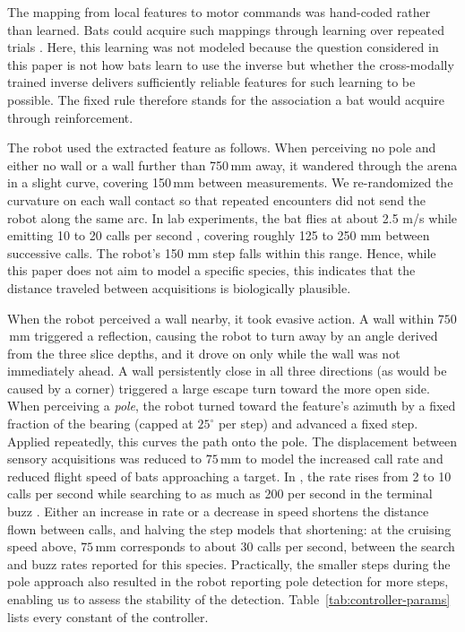 \documentclass[11pt]{article}
\begin{document}
The mapping from local features to motor commands was hand-coded rather than learned. Bats could acquire such mappings through learning over repeated trials \citep[e.g.,][]{Ghose2003,Falk2014,Simon2011,Holland2005,Finger2025}. Here, this learning was not modeled because the question considered in this paper is not how bats learn to use the inverse but whether the cross-modally trained inverse delivers sufficiently reliable features for such learning to be possible. The fixed rule therefore stands for the association a bat would acquire through reinforcement. %

The robot used the extracted feature as follows. When perceiving no pole and either no wall or a wall further than 750\,mm away, it wandered through the arena in a slight curve, covering 150\,mm between measurements. We re-randomized the curvature on each wall contact so that repeated encounters did not send the robot along the same arc. In lab experiments, the bat  flies at about 2.5 m/s while emitting 10 to 20 calls per second \citep[e.g.,][]{Barchi2013}, covering roughly 125 to 250 mm between successive calls. The robot's 150 mm step falls within this range. Hence, while this paper does not aim to model a specific species, this indicates that the distance traveled between acquisitions is biologically plausible.

When the robot perceived a wall nearby, it took evasive action. A wall within $750$\,mm triggered a reflection, causing the robot to turn away by an angle derived from the three slice depths, and it drove on only while the wall was not immediately ahead. A wall persistently close in all three directions (as would be caused by a corner) triggered a large escape turn toward the more open side. When perceiving a \emph{pole}, the robot turned toward the feature's azimuth by a fixed fraction of the bearing (capped at $25^{\circ}$ per step) and advanced a fixed step. Applied repeatedly, this curves the path onto the pole. The displacement between sensory acquisitions was reduced to $75$\,mm to model the increased call rate and reduced flight speed of bats approaching a target. In , the rate rises from 2 to 10 calls per second while searching to as much as 200 per second in the terminal buzz \citep{Ghose2006}. Either an increase in rate or a decrease in speed shortens the distance flown between calls, and halving the step models that shortening: at the cruising speed above, $75$\,mm corresponds to about 30 calls per second, between the search and buzz rates reported for this species. Practically, the smaller steps during the pole approach also resulted in the robot reporting pole detection for more steps, enabling us to assess the stability of the detection. Table~\ref{tab:controller-params} lists every constant of the controller.
\end{document}
